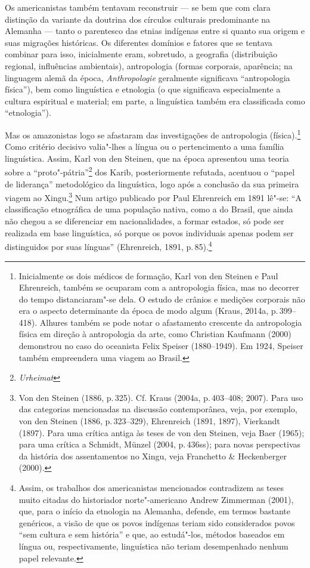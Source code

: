 Os americanistas também tentavam reconstruir --- se bem que com clara
distinção da variante da doutrina dos círculos culturais predominante na
Alemanha --- tanto o parentesco das etnias indígenas entre si quanto sua
origem e suas migrações históricas. Os diferentes domínios e fatores que
se tentava combinar para isso, inicialmente eram, sobretudo, a
geografia (distribuição regional, influências ambientais), antropologia
(formas corporais, aparência; na linguagem alemã da época,
\textit{Anthropologie} geralmente significava ``antropologia física''),
bem como linguística e etnologia (o que significava especialmente a
cultura espiritual e material; em parte, a linguística também era
classificada como ``etnologia'').

Mas os amazonistas logo se afastaram das investigações de antropologia
(física).\footnote{Inicialmente os dois médicos de formação, Karl von
  den Steinen e Paul Ehrenreich, também se ocuparam com a antropologia
  física, mas no decorrer do tempo distanciaram"-se dela. O estudo de
  crânios e medições corporais não era o aspecto determinante da época
  de modo algum (Kraus, 2014a, p.\,399--418). Alhures também se pode notar
  o afastamento crescente da antropologia física em direção à
  antropologia da arte, como Christian Kaufmann (2000) demonstrou no
  caso do oceanista Felix Speiser (1880--1949). Em 1924, Speiser também
  empreendera uma viagem ao Brasil.} Como critério decisivo valia"-lhes a
língua ou o pertencimento a uma família linguística. Assim, Karl von den
Steinen, que na época apresentou uma teoria sobre a ``proto"-pátria''\footnote{\textit{Urheimat}} dos Karib, posteriormente refutada, acentuou o
``papel de liderança'' metodológico da linguística, logo após a
conclusão da sua primeira viagem ao Xingu.\footnote{Von den Steinen
  (1886, p.\,325). Cf. Kraus (2004a, p.\,403--408; 2007). Para uso das
  categorias mencionadas na discussão contemporânea, veja, por exemplo,
  von den Steinen (1886, p.\,323--329), Ehrenreich (1891, 1897), Vierkandt
  (1897). Para uma crítica antiga às teses de von den Steinen, veja Baer
  (1965); para uma crítica a Schmidt, Münzel (2004, p.\,436ss); para
  novas perspectivas da história dos assentamentos no Xingu, veja
  Franchetto \& Heckenberger (2000).} Num artigo publicado por Paul
Ehrenreich em 1891 lê"-se: ``A classificação etnográfica de uma população
nativa, como a do Brasil, que ainda não chegou a se diferenciar em
nacionalidades, a formar estados, só pode ser realizada em base
linguística, só porque os povos individuais apenas podem ser
distinguidos por suas línguas'' (Ehrenreich, 1891, p.\,85).\footnote{Assim,
  os trabalhos dos americanistas mencionados contradizem as teses muito
  citadas do historiador norte"-americano Andrew Zimmerman (2001), que,
  para o início da etnologia na Alemanha, defende, em termos bastante
  genéricos, a visão de que os povos indígenas teriam sido considerados
  povos ``sem cultura e sem história'' e que, ao estudá"-los, métodos
  baseados em língua ou, respectivamente, linguística não teriam
  desempenhado nenhum papel relevante.}

